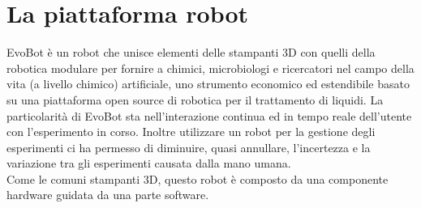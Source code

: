 \chapter{La piattaforma robot}

\label{cha:789}
EvoBot è un robot che unisce elementi delle stampanti 3D con quelli della robotica modulare per fornire a chimici, microbiologi e ricercatori nel campo della vita (a livello chimico) artificiale, uno strumento economico ed estendibile basato su una piattaforma open source di robotica per il trattamento di liquidi. La particolarità di EvoBot sta nell'interazione continua ed in tempo reale dell'utente con l'esperimento in corso.\cite{introd-robot} Inoltre utilizzare un robot per la gestione degli esperimenti ci ha permesso di diminuire, quasi annullare, l'incertezza e la variazione tra gli esperimenti causata dalla mano umana. 
\\Come le comuni stampanti 3D,  questo robot è composto da una componente hardware guidata da una parte software. 

